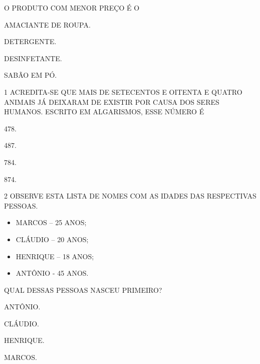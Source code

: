 O PRODUTO COM MENOR PREÇO É O

\begin{escolha}[itemsep=0pt]
\item AMACIANTE DE ROUPA.

\item DETERGENTE.

\item DESINFETANTE.

\item SABÃO EM PÓ.
\end{escolha}




\num{1} ACREDITA-SE QUE MAIS DE SETECENTOS E OITENTA E QUATRO ANIMAIS JÁ
DEIXARAM DE EXISTIR POR CAUSA DOS SERES HUMANOS. ESCRITO EM ALGARISMOS, ESSE NÚMERO É

\begin{escolha}[itemsep=0pt]
\item 478.

\item 487.

\item 784.

\item 874.
\end{escolha}

\num{2} OBSERVE ESTA LISTA DE NOMES COM AS IDADES DAS RESPECTIVAS PESSOAS.

\begin{myquote}
\begin{itemize}
  \item MARCOS -- 25 ANOS;
  \item CLÁUDIO -- 20 ANOS;
  \item HENRIQUE -- 18 ANOS;
  \item ANTÔNIO - 45 ANOS.
\end{itemize}
\end{myquote}

QUAL DESSAS PESSOAS NASCEU PRIMEIRO?

\begin{escolha}[itemsep=0pt]
\item ANTÔNIO.

\item CLÁUDIO.

\item HENRIQUE.

\item MARCOS.
\end{escolha}

